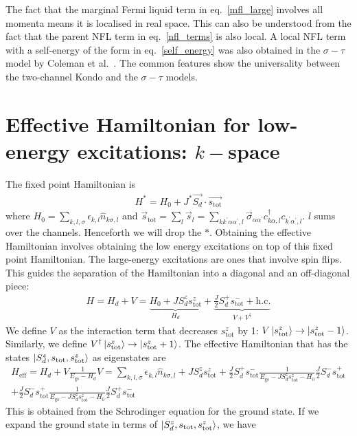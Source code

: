 \documentclass[12pt]{revtex4-2}
\begin{document}
The fact that the marginal Fermi liquid term in eq.~\ref{mfl_large} involves all momenta means it is localised in real space. This can also be understood from the fact that the parent NFL term in eq.~\ref{nfl_terms} is also local. A local NFL term with a self-energy of the form in eq.~\ref{self_energy} was also obtained in the \(\sigma-\tau\) model by Coleman et al.~\cite{Coleman_tsvelik}. The common features show the universality between the two-channel Kondo and the \(\sigma-\tau\) models.
\section{Effective Hamiltonian for low-energy excitations: \(k-\)space}
The fixed point Hamiltonian is
\begin{align}
	H^* = H_0 + J^* \vec{S_d}\cdot\vec{s_\text{tot}}
\end{align}
where \(H_0 = \sum_{k,l,\sigma}\epsilon_{k,l}\hat n_{k\sigma,l}\) and \(\vec s_\text{tot} = \sum_l \vec s_l = \sum_{kk^\prime\alpha\alpha^\prime,l} \vec \sigma_{\alpha\alpha^\prime}c^\dagger_{k\alpha,l}c_{k^\prime\alpha^\prime,l}\). \(l\) sums over the channels. Henceforth we will drop the \(*\). Obtaining the effective Hamiltonian involves obtaining the low energy excitations on top of this fixed point Hamiltonian. The large-energy excitations are ones that involve spin flips. This guides the separation of the Hamiltonian into a diagonal and an off-diagonal piece:
\begin{align}
	H = H_d + V = \underbrace{H_0 + J S_d^z s_\text{tot}^z}_{H_d} + \underbrace{\frac{J}{2}S_d^+ s_\text{tot}^- + \text{h.c.}}_{V + V^\dagger}
\end{align}
We define \(V\) as the interaction term that decreases \(s_\text{tot}^z\) by 1: \(V \ket{s_\text{tot}^z} \to \ket{s_\text{tot}^z - 1}\). Similarly, we define \(V^\dagger \ket{s_\text{tot}^z} \to \ket{s_\text{tot}^z + 1}\). The effective Hamiltonian that has the states \(\ket{S_d^z, s_\text{tot}, s_\text{tot}^z}\) as eigenstates are
\begin{align}
	H_\text{eff} = H_d + V \frac{1}{E_\text{gs} - H_d}V = \sum_{k,l,\sigma}\epsilon_{k,l}\hat n_{k\sigma,l} + J S_d^z s_\text{tot}^z + \frac{J}{2}S_d^+ s_\text{tot}^- \frac{1}{E_\text{gs} - J S_d^z s_\text{tot}^z - H_0}\frac{J}{2}S_d^- s_\text{tot}^+\\
	+\frac{J}{2}S_d^- s_\text{tot}^+ \frac{1}{E_\text{gs} - J S_d^z s_\text{tot}^z - H_0}\frac{J}{2}S_d^+ s_\text{tot}^-
\end{align}
This is obtained from the Schrodinger equation for the ground state. If we expand the ground state in terms of \(\ket{S_d^z, s_\text{tot}, s_\text{tot}^z}\), we have 
\end{document}

